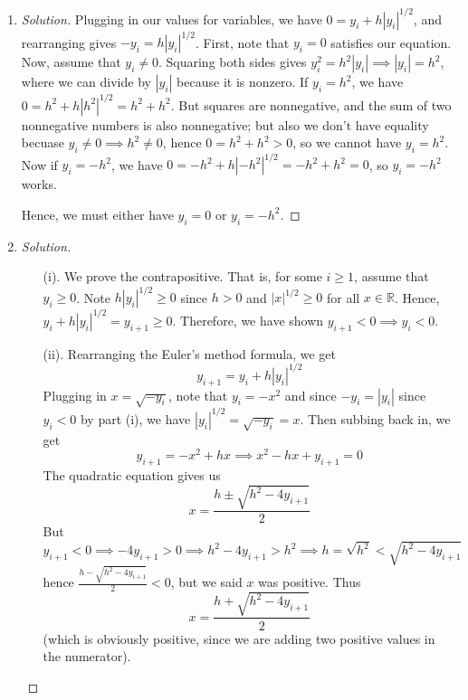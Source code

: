 \documentclass{article}
\newcommand{\R}{{\mathbb R}}
\begin{document}
\begin{enumerate}
	\item \begin{proof}[Solution]\let\qed\relax
		Plugging in our values for variables, we have $0 = y_i + h|y_i|^{1/2}$,
		and rearranging gives $-y_i = h|y_i|^{1/2}$.
		First, note that $y_i = 0$ satisfies our equation.
		Now, assume that $y_i \neq 0$.
		Squaring both sides gives $y_i^2 = h^2|y_i| \implies |y_i| = h^2$,
		where we can divide by $|y_i|$ because it is nonzero.
		If $y_i = h^2$, we have $0 = h^2 + h|h^2|^{1/2} = h^2 + h^2$.
		But squares are nonnegative, and the sum of two nonnegative numbers
		is also nonnegative;
		but also we don't have equality becuase $y_i \neq 0 \implies h^2 \neq 0$,
		hence $0 = h^2 + h^2 > 0$, so we cannot have $y_i = h^2$.
		Now if $y_i = -h^2$, we have $0 = -h^2 + h|-h^2|^{1/2} = -h^2 + h^2 = 0$,
		so $y_i = -h^2$ works.

		Hence, we must either have $y_i = 0$ or $y_i = -h^2$.
	\end{proof}
	\item \begin{proof}[Solution]\let\qed\relax
		\begin{enumerate}
			\item[(i).] We prove the contrapositive.
				That is, for some $i \geq 1$, assume that $y_i \geq 0$.
				Note $h|y_i|^{1/2} \geq 0$ since $h > 0$ and $|x|^{1/2} \geq 0$
				for all $x \in \R$.
				Hence, $y_i + h|y_i|^{1/2} = y_{i+1} \geq 0$.
				Therefore, we have shown $y_{i+1} < 0 \implies y_i < 0$.
			\item[(ii).] Rearranging the Euler's method formula, we get
				\[
					y_{i+1} = y_i + h|y_i|^{1/2}
				\]
				Plugging in $x = \sqrt{-y_i}$, note that
				$y_i = -x^2$ and since $-y_i = |y_i|$ since $y_i < 0$ by part (i),
				we have $|y_i|^{1/2} = \sqrt{-y_i} = x$.
				Then subbing back in, we get
				\[
					y_{i+1} = -x^2 + hx \implies x^2 - hx + y_{i+1} = 0
				\]
				The quadratic equation gives us
				\[
					x = \frac{h \pm \sqrt{h^2 - 4y_{i+1}}}{2}
				\]
				But $y_{i+1} < 0 \implies -4y_{i+1} > 0 \implies
				h^2 - 4y_{i+1} > h^2 \implies h = \sqrt{h^2} < \sqrt{h^2 - 4y_{i+1}}$
				hence $\frac{h-\sqrt{h^2 - 4y_{i+1}}}{2} < 0$,
				but we said $x$ was positive.
				Thus
				\[
					x = \frac{h + \sqrt{h^2 - 4y_{i+1}}}{2}
				\]
				(which is obviously positive, since we are adding two
				positive values in the numerator).


\end{enumerate}
\end{proof}
\end{enumerate}
\end{document}
